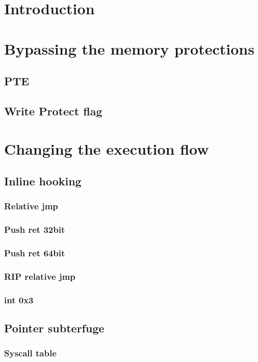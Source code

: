 \documentclass{article}
\begin{document}
\pagestyle{empty}
\titleAT
\tableofcontents

\section{Introduction}

\section{Bypassing the memory protections}
\subsection{PTE}
\subsection{Write Protect flag}

\section{Changing the execution flow}
\subsection{Inline hooking}
\subsubsection{Relative jmp}
\subsubsection{Push ret 32bit}
\subsubsection{Push ret 64bit}
\subsubsection{RIP relative jmp}
\subsubsection{int 0x3}

\subsection{Pointer subterfuge}
\subsubsection{Syscall table}
\end{document}
